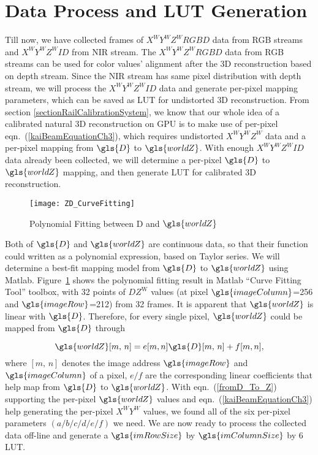 \section{Data Process and \gls{LUT} Generation}
\label{sectionDataProcessLUTgeneration}
Till now, we have collected frames of \(X^WY^WZ^WRGBD\) data from RGB streams and \(X^WY^WZ^WID\) from \gls{NIR} stream. The \(X^WY^WZ^WRGBD\) data from RGB streams can be used for color values' alignment after the \gls{3D} reconstruction based on depth stream. Since the \gls{NIR} stream has same pixel distribution with depth stream, we will process the \(X^WY^WZ^WID\) data and generate per-pixel mapping parameters, which can be saved as \gls{LUT} for undistorted \gls{3D} reconstruction. From section \ref{sectionRailCalibrationSystem}, we know that our whole idea of a calibrated natural \gls{3D} reconstruction on \gls{GPU} is to make use of per-pixel eqn.~(\ref{kaiBeamEquationCh3}), which requires undistorted \(X^WY^WZ^W\) data and a per-pixel mapping from \(\gls{D}\) to \(\gls{worldZ}\). With enough \(X^WY^WZ^WID\) data already been collected, we will determine a per-pixel \(\gls{D}\) to \(\gls{worldZ}\) mapping, and then generate \gls{LUT} for calibrated \gls{3D} reconstruction.
\\\indent
\begin{figure}[b]
\centering
\texttt{[image: ZD\_CurveFitting]}
\caption{Polynomial Fitting between \gls{D} and \(\gls{worldZ}\)}
\label{ZD_CurveFitting}
\end{figure}%
%
Both of \(\gls{D}\) and \(\gls{worldZ}\) are continuous data, so that their function could written as a polynomial expression, based on Taylor series. We will determine a best-fit mapping model from \(\gls{D}\) to \(\gls{worldZ}\) using Matlab. Figure~\ref{ZD_CurveFitting} shows the polynomial fitting result in Matlab \enquote{Curve Fitting Tool} toolbox, with 32 points of \(DZ^\text{W}\) values (at pixel \(\gls{imageColumn}\)=256 and \(\gls{imageRow}\)=212) from 32 frames. It is apparent that \(\gls{worldZ}\) is linear with \(\gls{D}\). Therefore, for every single pixel, \(\gls{worldZ}\) could be mapped from \(\gls{D}\) through \par
%
\begin{equation}
\gls{worldZ} [m, \, n] = e [m, n] \gls{D} [m, \, n]+f [m, n] ,
\label{fromD_To_Z}
\end{equation}%
%
\noindent
where \([m, \, n]\) denotes the image address \(\gls{imageRow}\) and \(\gls{imageColumn}\) of a pixel, \(e/f\) are the corresponding linear coefficients that help map from \(\gls{D}\) to \(\gls{worldZ}\). With eqn.~(\ref{fromD_To_Z}) supporting the per-pixel \(\gls{worldZ}\) values and eqn.~(\ref{kaiBeamEquationCh3}) help generating the per-pixel \(X^WY^W\) values, we found all of the six per-pixel parameters \((a/b/c/d/e/f)\) we need. We are now ready to process the collected data off-line and generate a \(\gls{imRowSize}\) by \(\gls{imColumnSize}\) by 6 \gls{LUT}.
